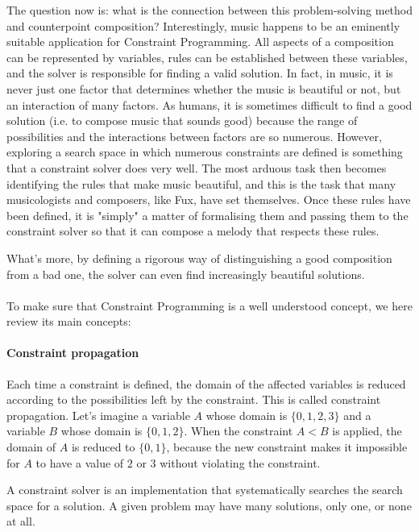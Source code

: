 The question now is: what is the connection between this problem-solving method and counterpoint composition? Interestingly, music happens to be an eminently suitable application for Constraint Programming. All aspects of a composition can be represented by variables, rules can be established between these variables, and the solver is responsible for finding a valid solution. In fact, in music, it is never just one factor that determines whether the music is beautiful or not, but an interaction of many factors. As humans, it is sometimes difficult to find a good solution (i.e. to compose music that sounds good) because the range of possibilities and the interactions between factors are so numerous. However, exploring a search space in which numerous constraints are defined is something that a constraint solver does very well. The most arduous task then becomes identifying the rules that make music beautiful, and this is the task that many musicologists and composers, like Fux, have set themselves. Once these rules have been defined, it is "simply" a matter of formalising them and passing them to the constraint solver so that it can compose a melody that respects these rules.

What's more, by defining a rigorous way of distinguishing a good composition from a bad one, the solver can even find increasingly beautiful solutions.
\paragraph{}
To make sure that Constraint Programming is a well understood concept, we here review its main concepts:

\paragraph{Constraint propagation}
Each time a constraint is defined, the domain of the affected variables is reduced according to the possibilities left by the constraint. This is called constraint propagation. Let's imagine a variable $A$ whose domain is $\{0, 1, 2, 3\}$ and a variable $B$ whose domain is $\{0, 1, 2\}$. When the constraint $A<B$ is applied, the domain of $A$ is reduced to $\{0, 1\}$, because the new constraint makes it impossible for $A$ to have a value of $2$ or $3$ without violating the constraint.

A constraint solver is an implementation that systematically searches the search space for a solution. A given problem may have many solutions, only one, or none at all.

